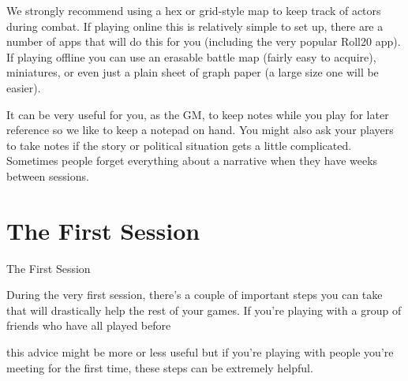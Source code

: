 We strongly recommend using a hex or grid-style map to keep track of actors during
combat. If playing online this is relatively simple to set up, there are a number of apps that will
do this for you (including the very popular Roll20 app). If playing offline you can use an erasable
battle map (fairly easy to acquire), miniatures, or even just a plain sheet of graph paper (a large
size one will be easier).


It can be very useful for you, as the GM, to keep notes while you play for later reference so we
like to keep a notepad on hand. You might also ask your players to take notes if the story or
political situation gets a little complicated. Sometimes people forget everything about a narrative
when they have weeks between sessions.

\section{The First Session}
                                                The First Session

During the very first session, there’s a couple of important steps you can take that will drastically
help the rest of your games. If you’re playing with a group of friends who have all played before




this advice might be more or less useful but if you’re playing with people you’re meeting for the
first time, these steps can be extremely helpful.


